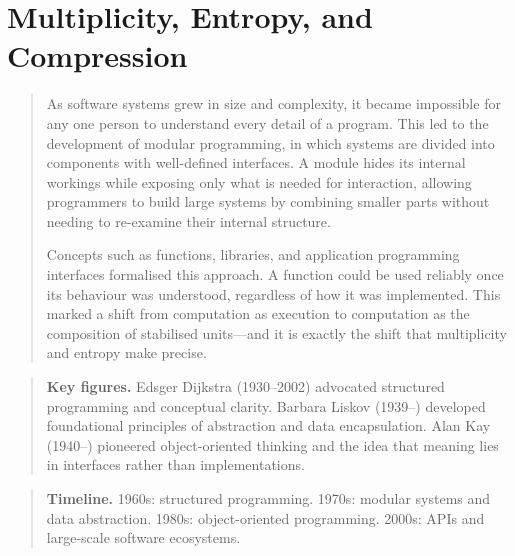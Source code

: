\documentclass[11pt]{book}
\theoremstyle{plain}
\theoremstyle{definition}
\theoremstyle{remark}
\newenvironment{historicalpreamble}
  {\begin{quote}\small}
  {\end{quote}}
\newenvironment{historicalfigures}
  {\begin{quote}\small\textbf{Key figures.}\enspace\ignorespaces}
  {\end{quote}}
\newenvironment{paradigmtimeline}
  {\begin{quote}\small\textbf{Timeline.}\enspace\ignorespaces}
  {\end{quote}}
\begin{document}
\chapter{Multiplicity, Entropy, and Compression}

\begin{historicalpreamble}
As software systems grew in size and complexity, it became impossible for
any one person to understand every detail of a program. This led to the
development of modular programming, in which systems are divided into
components with well-defined interfaces. A module hides its internal
workings while exposing only what is needed for interaction, allowing
programmers to build large systems by combining smaller parts without
needing to re-examine their internal structure.

Concepts such as functions, libraries, and application programming
interfaces formalised this approach. A function could be used reliably
once its behaviour was understood, regardless of how it was implemented.
This marked a shift from computation as execution to computation as the
composition of stabilised units---and it is exactly the shift that
multiplicity and entropy make precise.
\end{historicalpreamble}

\begin{historicalfigures}
Edsger Dijkstra (1930--2002) advocated structured programming and
conceptual clarity. Barbara Liskov (1939--) developed foundational
principles of abstraction and data encapsulation. Alan Kay (1940--)
pioneered object-oriented thinking and the idea that meaning lies in
interfaces rather than implementations.
\end{historicalfigures}

\begin{paradigmtimeline}
1960s: structured programming. \quad
1970s: modular systems and data abstraction. \quad
1980s: object-oriented programming. \quad
2000s: APIs and large-scale software ecosystems.
\end{paradigmtimeline}
\end{document}

